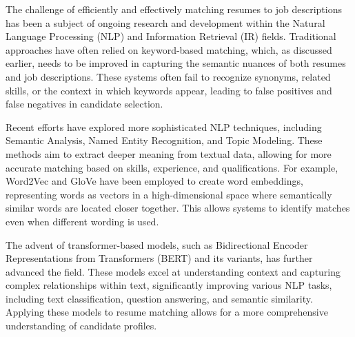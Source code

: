 \documentclass[12pt]{report}
\begin{document}
The challenge of efficiently and effectively matching resumes to job descriptions has been a subject of ongoing research and development within the Natural Language Processing (NLP) and Information Retrieval (IR) fields. \parencite{rojas-galeano-2022} Traditional approaches have often relied on keyword-based matching, which, as discussed earlier, needs to be improved in capturing the semantic nuances of both resumes and job descriptions. These systems often fail to recognize synonyms, related skills, or the context in which keywords appear, leading to false positives and false negatives in candidate selection.\parencite{gawande-2024}

Recent efforts have explored more sophisticated NLP techniques, including Semantic Analysis, Named Entity Recognition, and Topic Modeling. These methods aim to extract deeper meaning from textual data, allowing for more accurate matching based on skills, experience, and qualifications. For example, Word2Vec and GloVe have been employed to create word embeddings, representing words as vectors in a high-dimensional space where semantically similar words are located closer together. This allows systems to identify matches even when different wording is used. \parencite{alderham-2024}

The advent of transformer-based models, such as Bidirectional Encoder Representations from Transformers (BERT) and its variants, has further advanced the field. These models excel at understanding context and capturing complex relationships within text, significantly improving various NLP tasks, including text classification, question answering, and semantic similarity. Applying these models to resume matching allows for a more comprehensive understanding of candidate profiles.
\end{document}
